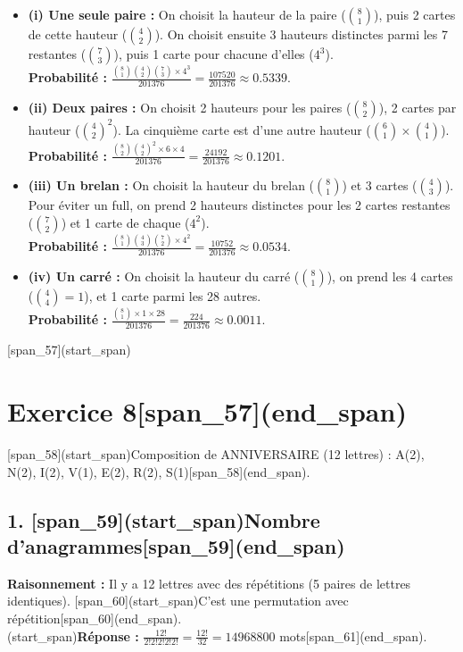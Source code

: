 \documentclass[11pt,a4paper]{article}
\begin{document}
\begin{itemize}
    \item \textbf{(i) Une seule paire :} On choisit la hauteur de la paire ($\binom{8}{1}$), puis 2 cartes de cette hauteur ($\binom{4}{2}$). On choisit ensuite 3 hauteurs distinctes parmi les 7 restantes ($\binom{7}{3}$), puis 1 carte pour chacune d'elles ($4^3$).\\
    \textbf{Probabilité :} $\frac{\binom{8}{1}\binom{4}{2}\binom{7}{3} \times 4^3}{201376} = \frac{107520}{201376} \approx 0.5339$.
    
    \item \textbf{(ii) Deux paires :} On choisit 2 hauteurs pour les paires ($\binom{8}{2}$), 2 cartes par hauteur ($\binom{4}{2}^2$). La cinquième carte est d'une autre hauteur ($\binom{6}{1} \times \binom{4}{1}$).\\
    \textbf{Probabilité :} $\frac{\binom{8}{2}\binom{4}{2}^2 \times 6 \times 4}{201376} = \frac{24192}{201376} \approx 0.1201$.
    
    \item \textbf{(iii) Un brelan :} On choisit la hauteur du brelan ($\binom{8}{1}$) et 3 cartes ($\binom{4}{3}$). Pour éviter un full, on prend 2 hauteurs distinctes pour les 2 cartes restantes ($\binom{7}{2}$) et 1 carte de chaque ($4^2$).\\
    \textbf{Probabilité :} $\frac{\binom{8}{1}\binom{4}{3}\binom{7}{2} \times 4^2}{201376} = \frac{10752}{201376} \approx 0.0534$.
    
    \item \textbf{(iv) Un carré :} On choisit la hauteur du carré ($\binom{8}{1}$), on prend les 4 cartes ($\binom{4}{4} = 1$), et 1 carte parmi les 28 autres.\\
    \textbf{Probabilité :} $\frac{\binom{8}{1} \times 1 \times 28}{201376} = \frac{224}{201376} \approx 0.0011$.
\end{itemize}

\hrulefill

[span_57](start_span)\section*{Exercice 8[span_57](end_span)}
[span_58](start_span)Composition de ANNIVERSAIRE (12 lettres) : A(2), N(2), I(2), V(1), E(2), R(2), S(1)[span_58](end_span).

\subsection*{1. [span_59](start_span)Nombre d'anagrammes[span_59](end_span)}
\textbf{Raisonnement :} Il y a 12 lettres avec des répétitions (5 paires de lettres identiques). [span_60](start_span)C'est une permutation avec répétition[span_60](end_span).\\
[span_61](start_span)\textbf{Réponse :} $\frac{12!}{2!2!2!2!2!} = \frac{12!}{32} = 14968800$ mots[span_61](end_span).
\end{document}
